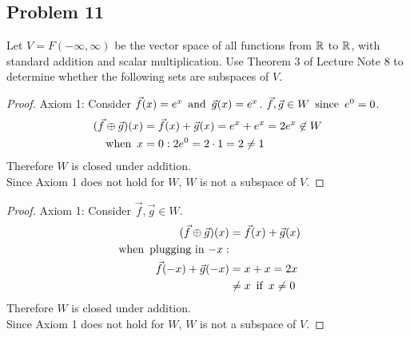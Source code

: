 \subsection*{Problem 11}
Let $V = F(-\infty, \infty)$ be the vector space of all functions from $\mathbb{R}$ to $\mathbb{R}$, with standard addition and scalar multiplication. Use Theorem 3 of Lecture Note 8 to determine whether the following sets are subspaces of $V$.
\begin{enumerate}
  \begin{proof}
    Axiom 1: Consider $\vec{f}(x) = e^x \operatorname{~\text{and}~} \vec{g}(x) = e^x$. $\vec{f}, \vec{g} \in W \operatorname{~\text{since}~} e^0 = 0$.
    \begin{align*}
      (\vec{f} \oplus \vec{g})(x) & = \vec{f}(x) + \vec{g}(x) = e^x + e^x = 2e^x \not \in W \\
      \operatorname{~\text{when}~} x                    & = 0: 2e^0 = 2 \cdot 1 = 2 \neq 1
    \end{align*}
    Therefore $W$ is  closed under addition. \\
    Since Axiom 1 does not hold for $W$, $W$ is not a subspace of $V$.
  \end{proof}
  \begin{proof}
    Axiom 1: Consider $\vec{f}, \vec{g} \in W$.
    \begin{align*}
      (\vec{f} \oplus \vec{g})(x) & = \vec{f}(x) + \vec{g}(x) \\
      \operatorname{~\text{when}~} \text{plugging in $-x$}:                         \\
      \vec{f}(-x) + \vec{g}(-x)   & = x + x = 2x              \\
                                  & \neq x \operatorname{~\text{if}~} x \neq 0
    \end{align*}
    Therefore $W$ is  closed under addition. \\
    Since Axiom 1 does not hold for $W$, $W$ is not a subspace of $V$.
  \end{proof}
\end{enumerate}

